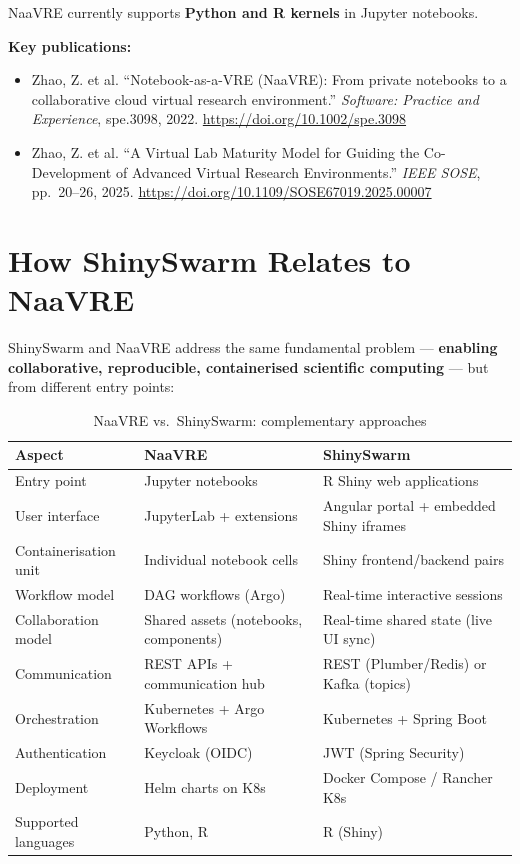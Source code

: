 \documentclass[12pt,a4paper]{article}
\begin{document}
NaaVRE currently supports \textbf{Python and R kernels} in Jupyter notebooks.

\textbf{Key publications:}
\begin{itemize}[nosep]
  \item Zhao, Z. et al. ``Notebook-as-a-VRE (NaaVRE): From private notebooks to a collaborative cloud virtual research environment.'' \textit{Software: Practice and Experience}, spe.3098, 2022. \url{https://doi.org/10.1002/spe.3098}
  \item Zhao, Z. et al. ``A Virtual Lab Maturity Model for Guiding the Co-Development of Advanced Virtual Research Environments.'' \textit{IEEE SOSE}, pp.\ 20--26, 2025. \url{https://doi.org/10.1109/SOSE67019.2025.00007}
\end{itemize}

\section{How ShinySwarm Relates to NaaVRE}

ShinySwarm and NaaVRE address the same fundamental problem --- \textbf{enabling collaborative, reproducible, containerised scientific computing} --- but from different entry points:

\begin{table}[h]
\centering
\small
\begin{tabular}{@{}lll@{}}
\toprule
\textbf{Aspect} & \textbf{NaaVRE} & \textbf{ShinySwarm} \\
\midrule
Entry point & Jupyter notebooks & R Shiny web applications \\
User interface & JupyterLab + extensions & Angular portal + embedded Shiny iframes \\
Containerisation unit & Individual notebook cells & Shiny frontend/backend pairs \\
Workflow model & DAG workflows (Argo) & Real-time interactive sessions \\
Collaboration model & Shared assets (notebooks, components) & Real-time shared state (live UI sync) \\
Communication & REST APIs + communication hub & REST (Plumber/Redis) or Kafka (topics) \\
Orchestration & Kubernetes + Argo Workflows & Kubernetes + Spring Boot \\
Authentication & Keycloak (OIDC) & JWT (Spring Security) \\
Deployment & Helm charts on K8s & Docker Compose / Rancher K8s \\
Supported languages & Python, R & R (Shiny) \\
\bottomrule
\end{tabular}
\caption{NaaVRE vs.\ ShinySwarm: complementary approaches}
\end{table}
\end{document}
